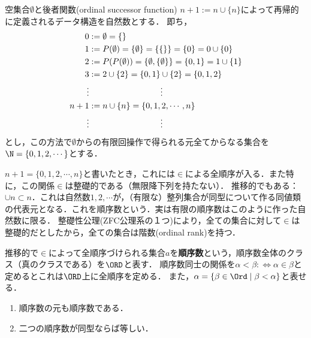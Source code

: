 \documentclass[uplatex,dvipdfmx]{jsreport}
\begin{document}
\begin{definition}
    空集合$\emptyset$と後者関数(ordinal successor function) $n+1:=n\cup\{n\}$によって再帰的に定義されるデータ構造を自然数とする．
    即ち，
    \begin{align*}
        0&:=\emptyset=\{\}\\
        1&:=P(\emptyset)=\{\emptyset\}=\{\{\}\}=\{0\}=0\cup\{0\}\\
        2&:=P(P(\emptyset))=\{\emptyset,\{\emptyset\}\}=\{0,1\}=1\cup\{1\}\\
        3&:=2\cup\{2\}=\{0,1\}\cup\{2\}=\{0,1,2\}\\
        \vdots&\hphantom{:=2\cup\{2\}=\{0,1\}}\;\vdots\\
        n+1&:=n\cup\{n\}=\{0,1,2,\cdots,n\}\\
        \vdots&\hphantom{:=2\cup\{2\}=\{0,1\}}\;\vdots
    \end{align*}
    とし，この方法で$\emptyset$からの有限回操作で得られる元全てからなる集合を$\N=\{0,1,2,\cdots\}$とする．
\end{definition}
\begin{remark}[基数と順序数]
    $n+1=\{0,1,2,\cdots,n\}$と書いたとき，これには$\in$による全順序が入る．また特に，この関係$\in$は整礎的である（無限降下列を持たない）．
    推移的でもある：$\cup n\subset n$．これは自然数$1,2,\cdots$が，（有限な）整列集合が同型について作る同値類の代表元となる．これを順序数という．実は有限の順序数はこのように作った自然数に限る．
    整礎性公理(ZFC公理系の１つ)により，全ての集合に対して$\in$は整礎的だとしたから，全ての集合は階数(ordinal rank)を持つ．
\end{remark}
\begin{definition}
    推移的で$\in$によって全順序づけられる集合$a$を\textbf{順序数}という，順序数全体のクラス（真のクラスである）を$\ORD$と表す．
    順序数同士の関係を$\alpha<\beta:\Leftrightarrow\alpha\in\beta$と定めるとこれは$\ORD$上に全順序を定める．
    また，$\alpha=\{\beta\in\Ord\mid\beta<\alpha\}$と表せる．
\end{definition}
\begin{lemma}\mbox{}
    \begin{enumerate}
        \item 順序数の元も順序数である．
        \item 二つの順序数が同型ならば等しい．
    \end{enumerate}
\end{lemma}
\end{document}
